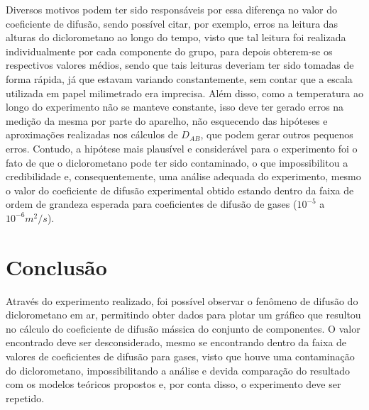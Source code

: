 Diversos motivos podem ter sido responsáveis por essa diferença no valor do coeficiente de difusão, sendo possível citar, por exemplo, erros na leitura das alturas do diclorometano ao longo do tempo, visto que tal leitura foi realizada individualmente por cada componente do grupo, para depois obterem-se os respectivos valores médios, sendo que tais leituras deveriam ter sido tomadas de forma rápida, já que estavam variando constantemente, sem contar que a escala utilizada em papel milimetrado era imprecisa. Além disso, como a temperatura ao longo do experimento não se manteve constante, isso deve ter gerado erros na medição da mesma por parte do aparelho, não esquecendo das hipóteses e aproximações realizadas nos cálculos de $D_{AB}$, que podem gerar outros pequenos erros. Contudo, a hipótese mais plausível e considerável para o experimento foi o fato de que o diclorometano pode ter sido contaminado, o que impossibilitou a credibilidade e, consequentemente, uma análise adequada do experimento, mesmo o valor do coeficiente de difusão experimental obtido estando dentro da faixa de ordem de grandeza esperada para coeficientes de difusão de gases ($10^{-5}$ a $10^{-6} m^{2}/s$).
\\

\chapter{Conclusão}

Através do experimento realizado, foi possível observar o fenômeno de difusão do diclorometano em ar, permitindo obter dados para plotar um gráfico que resultou no cálculo do coeficiente de difusão mássica do conjunto de componentes. O valor encontrado deve ser desconsiderado, mesmo se encontrando dentro da faixa de valores de coeficientes de difusão para gases, visto que houve uma contaminação do diclorometano, impossibilitando a análise e devida comparação do resultado com os modelos teóricos propostos e, por conta disso, o experimento deve ser repetido.
